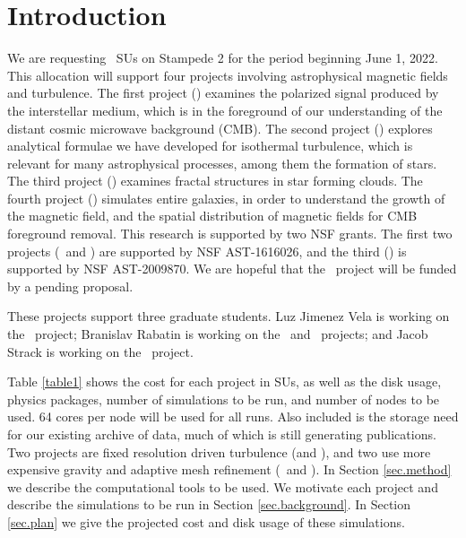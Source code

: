 \section{Introduction}
\label{sec.intro}

We are requesting \SUtotal\ SUs on Stampede 2 for the period beginning June 1,
2022.  This allocation will support four projects involving astrophysical
magnetic fields and turbulence.  The first project  (\nameCMB) examines the polarized signal
produced by the interstellar medium, which is in the foreground of our understanding of
the distant cosmic microwave background (CMB). The second project (\nameTurbulence) explores analytical
formulae we have developed for isothermal turbulence, which is relevant for many
astrophysical processes, among them the formation of stars.
  The third project (\nameCores) examines fractal structures in star forming clouds. The fourth project (\nameGalaxies)
simulates entire galaxies, in order to understand the growth of the magnetic
field, and the spatial distribution of magnetic fields for CMB foreground
removal.
This research is supported by two NSF grants.  The first two projects
(\nameTurbulence\ and \nameCores)  
are
supported by NSF AST-1616026, and the third (\nameCMB) is supported by 
NSF AST-2009870.
We are hopeful that the \nameGalaxies\ project will be funded by a pending
proposal.

These projects support three graduate students.  Luz Jimenez Vela is working on
the \nameCores\ project; Branislav Rabatin is working on the \nameTurbulence\
and \nameCMB\ projects; and Jacob Strack is working on the \nameGalaxies\
project.


Table \ref{table1} shows the cost for each project in SUs, as well as the disk
usage, physics packages, number of simulations to be run, and number of nodes to
be used.  64 cores per node will be used for all runs.  Also included is the
storage need for our existing archive of data, much of which is still generating
publications.
Two projects are fixed resolution driven turbulence (\nameTurbulence and \nameCMB), and two use
more expensive gravity and adaptive mesh refinement (\nameCores\ and
\nameGalaxies). In Section \ref{sec.method} we
describe the computational tools to be used.  
We motivate each project and describe the simulations to be
run in Section
\ref{sec.background}.  In Section \ref{sec.plan} we
give the projected cost  and disk usage of these simulations.

